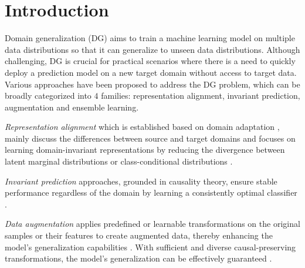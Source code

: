 \section{Introduction}\label{sec:main_intro}

Domain generalization (DG) aims to train a machine learning model on multiple data distributions so that it can generalize to unseen data distributions. Although challenging, DG is crucial for practical scenarios where there is a need to quickly deploy a prediction model on a new target domain without access to target data. Various approaches have been proposed to address the DG problem, which can be broadly categorized into $4$ families: representation alignment, invariant prediction, augmentation and  ensemble learning. 

\textit{Representation alignment} which is established based on domain adaptation \citep{ben2010theory, ben2001support, phung2021learning, zhou2020deep, johansson2019support}, mainly discuss the differences between source and target domains and focuses on learning domain-invariant representations by reducing the divergence between latent marginal distributions \citep{long2017conditional, ganin2016domain, nguyen2021domain, shen2018wasserstein, xie2017controllable, ilse2020diva} or class-conditional distributions \citep{gong2016domain, li2018deep, tachet2020domain}. 


\textit{Invariant prediction} approaches, grounded in causality theory, ensure stable performance regardless of the domain by learning a consistently optimal classifier \citep{arjovsky2020irm, ahuja2020empirical, krueger2021out, li2022invariant,mitrovic2020representation, zhang2023causal}. %



\textit{Data augmentation} applies predefined or learnable transformations on the original samples or their features to create augmented data, thereby enhancing the model's generalization capabilities \citep{mitrovic2020representation, wang2022out, zhou2020deep, zhou2021domain, zhang2017mixup, wang2020heterogeneous, zhao2020maximum, yao2022improving, carluccidomain, yao2022pcl}.  With sufficient and diverse causal-preserving transformations, the model's generalization can be effectively guaranteed \citep{wang2020heterogeneous}.


